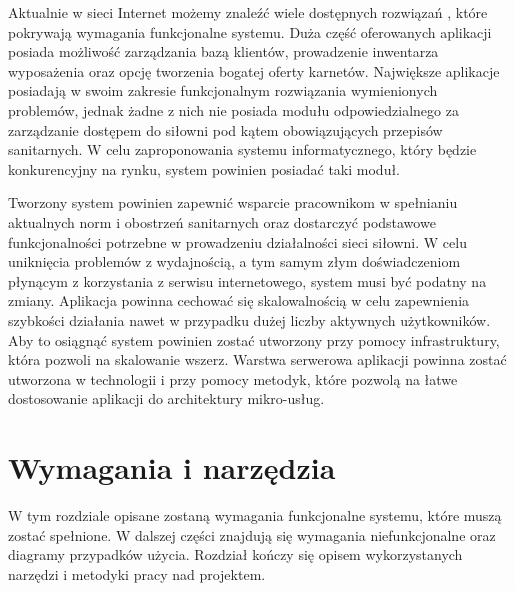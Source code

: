 \documentclass[a4paper,twoside,12pt]{book}
\begin{document}
Aktualnie w sieci Internet możemy znaleźć wiele dostępnych rozwiązań \cite{bib:perfectgym} \cite{bib:wodguru}, które pokrywają wymagania funkcjonalne systemu. Duża część oferowanych aplikacji posiada możliwość zarządzania bazą klientów, prowadzenie inwentarza wyposażenia oraz opcję tworzenia bogatej oferty karnetów. Największe aplikacje posiadają w swoim zakresie funkcjonalnym rozwiązania wymienionych problemów, jednak żadne z nich nie posiada modułu odpowiedzialnego za zarządzanie dostępem do siłowni pod kątem obowiązujących przepisów sanitarnych. W celu zaproponowania systemu informatycznego, który będzie konkurencyjny na rynku, system powinien posiadać taki moduł.

Tworzony system powinien zapewnić wsparcie pracownikom w spełnianiu aktualnych norm i obostrzeń sanitarnych oraz dostarczyć podstawowe funkcjonalności potrzebne w prowadzeniu działalności sieci siłowni. W celu uniknięcia problemów z wydajnością, a tym samym złym doświadczeniom płynącym z korzystania z serwisu internetowego, system musi być podatny na zmiany. Aplikacja powinna cechować się skalowalnością w celu zapewnienia szybkości działania nawet w przypadku dużej liczby aktywnych użytkowników. Aby to osiągnąć system powinien zostać utworzony przy pomocy infrastruktury, która pozwoli na skalowanie wszerz. Warstwa serwerowa aplikacji powinna zostać utworzona w technologii i przy pomocy metodyk, które pozwolą na łatwe dostosowanie aplikacji do architektury mikro-usług.

\chapter{Wymagania i narzędzia}
W tym rozdziale opisane zostaną wymagania funkcjonalne systemu, które muszą zostać spełnione. W dalszej części znajdują się wymagania niefunkcjonalne oraz diagramy przypadków użycia. Rozdział kończy się opisem wykorzystanych narzędzi i metodyki pracy nad projektem.
\end{document}
